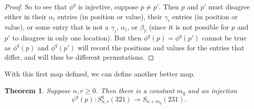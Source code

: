\documentclass[11pt]{amsart}
\newtheorem{theorem}{Theorem}[section]								\newtheorem{proposition}[theorem]{Proposition}
\theoremstyle{remark}
\numberwithin{equation}{section}
\begin{document}
\begin{proof}
    \vspace{10pt}
    So to see that $\phi^q$ is injective, suppose $p\neq p'$. Then $p$ and $p'$ must disagree either in their $\alpha_i$ entries (in position or value), their $\gamma_i$ entries (in position or value), or some entry that is not a $\gamma_i$, $\alpha_i$, or $\beta_1$ (since it is not possible for $p$ and $p'$ to disagree in only one location). But then $\phi^q(p) = \phi^q(p')$ cannot be true as $\phi^q(p)$ and $\phi^q(p')$ will record the positions and values for the entries that differ, and will thus be different permutations.
 
\end{proof}

\vspace{10pt}



With this first map defined, we can define another better map.
\begin{theorem}
    Suppose $n,r\geq 0$. Then there is a constant $m_q$ and an injection
    \[
    \psi^q(p):S_{n,r}^q(321)\rightarrow S_{n+m_q}(231).
    \]
\end{theorem}
\end{document}
